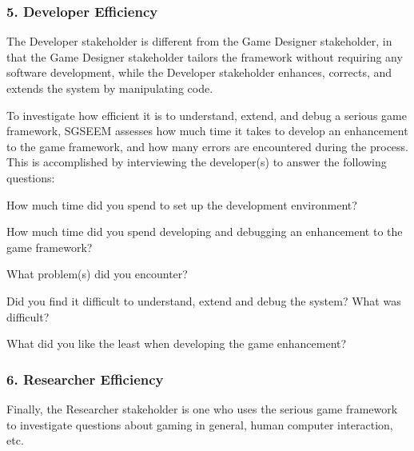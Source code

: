 \documentclass{sigchi}
\begin{document}


\subsubsection{5. Developer Efficiency}


The Developer stakeholder is different from the Game Designer stakeholder, in that the
Game Designer stakeholder tailors the framework without requiring any software
development, while the Developer stakeholder enhances, corrects, and extends the system by
manipulating code. 

To investigate how efficient it is to understand, extend, and debug a serious game
framework, SGSEEM assesses how much time it takes to develop an
enhancement to the game framework, and how many errors are encountered
during the process. This is accomplished by interviewing the developer(s) to
answer the following questions:

\begin{compactitem}
\item How much time did you spend to set up the development
  environment?
\item How much time did you spend developing and debugging an
  enhancement to the game framework?
\item What problem(s) did you encounter?
\item Did you find it difficult to understand, extend and debug the
  system? What was difficult?
\item What did you like the least when developing the game
  enhancement? 
\end{compactitem}



\subsubsection{6. Researcher Efficiency}


Finally, the Researcher stakeholder is one who uses the serious game framework to
investigate questions about gaming in general, human computer interaction, etc. 
\end{document}
